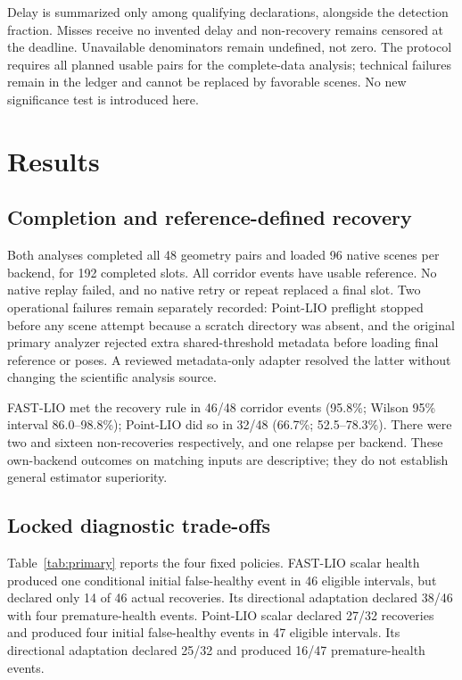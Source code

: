\documentclass[11pt,a4paper]{article}
\begin{document}
Delay is summarized only among qualifying declarations, alongside the
detection fraction. Misses receive no invented delay and non-recovery
remains censored at the deadline. Unavailable denominators remain undefined,
not zero. The protocol requires all planned usable pairs for the complete-data
analysis; technical failures remain in the ledger and cannot be replaced
by favorable scenes. No new significance test is introduced here.

\section{Results}
\subsection{Completion and reference-defined recovery}
Both analyses completed all 48 geometry pairs and loaded 96 native scenes
per backend, for 192 completed slots. All corridor events have usable reference.
No native replay failed, and no native retry or repeat replaced a final slot.
Two operational failures remain separately recorded: Point-LIO preflight
stopped before any scene attempt because a scratch directory was absent,
and the original primary analyzer rejected extra shared-threshold metadata
before loading final reference or poses. A reviewed metadata-only adapter
resolved the latter without changing the scientific analysis source.

FAST-LIO met the recovery rule in 46/48 corridor events (95.8\%; Wilson
95\% interval 86.0--98.8\%); Point-LIO did so in 32/48 (66.7\%; 52.5--78.3\%).
There were two and sixteen non-recoveries respectively, and one relapse per
backend. These own-backend outcomes on matching inputs are descriptive;
they do not establish general estimator superiority.

\subsection{Locked diagnostic trade-offs}
Table~\ref{tab:primary} reports the four fixed policies. FAST-LIO scalar
health produced one conditional initial false-healthy event in 46 eligible
intervals, but declared only 14 of 46 actual recoveries. Its directional
adaptation declared 38/46 with four premature-health events. Point-LIO scalar
declared 27/32 recoveries and produced four initial false-healthy events in
47 eligible intervals. Its directional adaptation declared 25/32 and
produced 16/47 premature-health events.
\end{document}
